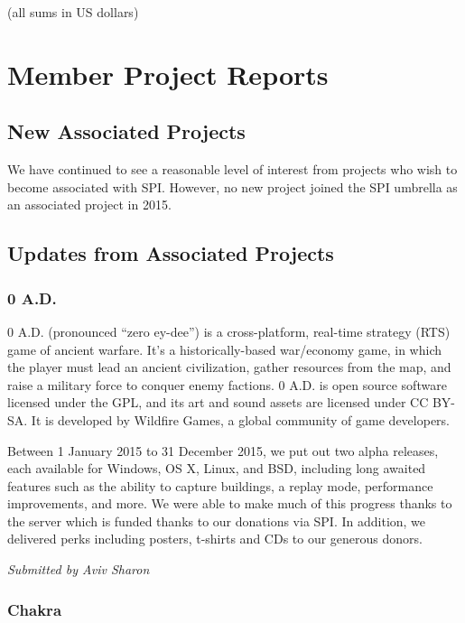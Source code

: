 \documentclass[letterpaper]{report}
\begin{document}
\begin{verbatim}
\end{verbatim}

(all sums in US dollars)


\chapter{Member Project Reports}

\section{New Associated Projects}

We have continued to see a reasonable level of interest from projects who
wish to become associated with SPI.  However, no new project joined the
SPI umbrella as an associated project in 2015.


\section{Updates from Associated Projects}

\subsection{0 A.D.}

0 A.D. (pronounced ``zero ey-dee'') is a cross-platform, real-time strategy
(RTS) game of ancient warfare. It's a historically-based war/economy game,
in which the player must lead an ancient civilization, gather resources
from the map, and raise a military force to conquer enemy factions. 0 A.D.
is open source software licensed under the GPL, and its art and sound
assets are licensed under CC BY-SA. It is developed by Wildfire Games, a
global community of game developers.

Between 1 January 2015 to 31 December 2015, we put out two alpha releases,
each available for Windows, OS X, Linux, and BSD, including long awaited
features such as the ability to capture buildings, a replay mode,
performance improvements, and more. We were able to make much of this
progress thanks to the server which is funded thanks to our donations via
SPI. In addition, we delivered perks including posters, t-shirts and CDs to
our generous donors.

{\em Submitted by Aviv Sharon}

\subsection{Chakra}
\end{document}
